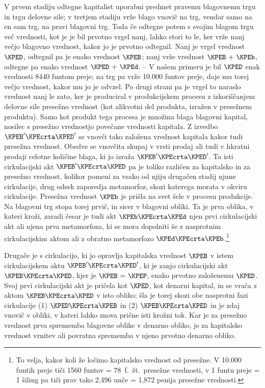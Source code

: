 \documentclass[kapital_02.tex]{subfiles}
\begin{document}
V prvem stadiju odtegne kapitalist uporabni predmet pravemu blagovnemu trgu in trgu delovne sile; v tretjem stadiju vrže blago vnovič na trg, vendar samo na en sam trg, na pravi blagovni trg. Toda če odtegne potem s svojim blagom trgu več vrednosti, kot je je bil prvotno vrgel nanj, lahko stori to le, ker vrže nanj večjo blagovno vrednost, kakor jo je prvotno odtegnil. Nanj je vrgel vrednost \(\KPED\), odtegnil pa je enako vrednost \(\KPEB\); nanj vrže vrednost \(\KPEB \textrm{ + } \KPEb\), odtegne pa enako vrednost \(\KPED \textrm{ + } \KPEd\). -- V našem primeru je bil \(\KPED\) enak vrednosti 8440 funtom preje; na trg pa vrže 10.000 funtov preje, daje mu torej večjo vrednost, kakor mu jo je odvzel. Po drugi strani pa je vrgel to naraslo vrednost nanj le zato, ker je produciral v produkcijskem procesu \KPEstran z izkoriščanjem delovne sile presežno vrednost (kot alikvotni del produkta, izražen v presežnem produktu). Samo kot produkt tega procesa je množina blaga blagovni kapital, nosilec s presežno vrednostjo povečane vrednosti kapitala. Z izvedbo \(\KPEB'\KPEcrta\KPED'\) se vnovči tako založena vrednost kapitala kakor tudi presežna vrednost. Obedve se vnovčita skupaj v vrsti prodaj ali tudi v hkratni prodaji celotne količine blaga, ki jo izraža \(\KPEB'\KPEcrta\KPED'\). Ta isti cirkulacijski akt \(\KPEB'\KPEcrta\KPED\) pa je toliko različen za kapitalsko in za presežno vrednost, kolikor pomeni za vsako od njiju drugačen stadij njune cirkulacije, drug odsek zaporedja metamorfoz, skozi katerega morata v okviru cirkulacije. Presežna vrednost \(\KPEb\) je prišla na svet šele v procesu produkcije. Na blagovni trg stopa torej prvič, in sicer v blagovni obliki. Ta je prva oblika, v kateri kroži, zaradi česar je tudi akt \(\KPEb\KPEcrta\KPEd\) njen prvi cirkulacijski akt ali njena prva metamorfoza, ki se mora dopolniti še z nasprotnim cirkulacijskim aktom ali z obratno metamorfozo \(\KPEd\KPEcrta\KPEb\).\footnote{To velja, kakor koli že ločimo kapitalsko vrednost od presežne. V 10.000 funtih preje tiči 1560 funtov = 78\ f.\ št.\ presežne vrednosti, v 1 funtu preje = 1 šiling pa tiči prav tako 2,496 unče = 1,872 penija presežne vrednosti.}

Drugače je s cirkulacijo, ki jo opravlja kapitalska vrednost \(\KPEB\) v istem cirkulacijskem aktu \(\KPEB'\KPEcrta\KPED'\), ki je zanjo cirkulacijski akt \(\KPEB\KPEcrta\KPED\), kjer je \(\KPEB \textrm{ = } \KPEP\), enako prvotno založenemu \(\KPED\). Svoj prvi cirkulacijski akt je pričela kot \(\KPED\), kot denarni kapital, in se vrača z aktom \(\KPEB\KPEcrta\KPED\) v isto obliko; šla je torej skozi obe nasprotni fazi cirkulacije (1) \(\KPED\KPEcrta\KPEB\) in (2) \(\KPEB\KPEcrta\KPED\) in je zdaj vnovič v obliki, v kateri lahko znova prične isti krožni tok. Kar je za presežno vrednost prva sprememba blagovne oblike v denarno obliko, je za kapitalsko vrednost vrnitev ali povratna sprememba v njeno prvotno denarno obliko.
\end{document}

